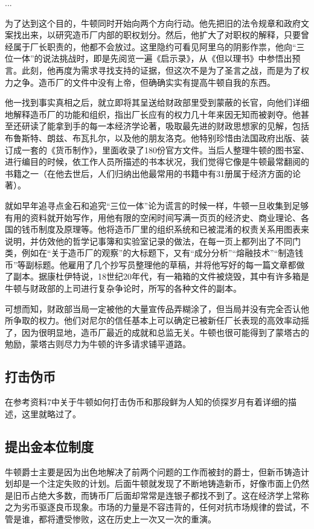 \documentclass[12pt,oneside]{book}
\begin{document}
\begin{mdframed}
...

为了达到这个目的，牛顿同时开始向两个方向行动。他先把旧的法令规章和政府文案找出来，以研究造币厂内部的职权划分。然后，他扩大了对职权的解释，只要曾经属于厂长职责的，他都不会放过。这里隐约可看见阿里乌的阴影作祟，他向“三位一体”的说法挑战时，即是先阅览一遍《启示录》，从《但以理书》中参悟出预言。此刻，他再度为需求寻找支持的证据，但这次不是为了圣言之战，而是为了权力之争。造币厂的文件中没有上帝，但确确实实有提高牛顿自我的东西。

他一找到事实真相之后，就立即将其呈送给财政部里受到蒙蔽的长官，向他们详细地解释造币厂的功能和组织，指出厂长应有的权力几十年来因无知而被剥夺。他甚至还研读了能拿到手的每一本经济学论著，吸取最先进的财政思想家的见解，包括布鲁斯特、朗兹、布瓦扎尔，以及他的朋友洛克。他特别珍惜由法国政府出版、装订成一套的《货币制作》，里面收录了180份官方文件。当后人整理牛顿的图书室、进行编目的时候，依工作人员所描述的书本状况，我们觉得它像是牛顿最常翻阅的书籍之一（在他去世后，人们归纳出他最常用的书籍中有31册属于经济方面的论著）。

就如早年追寻点金石和追究“三位一体”论为谎言的时候一样，牛顿一旦收集到足够有用的资料就开始写作，用他有限的空闲时间写满一页页的经济史、商业理论、各国的钱币制度及原理等。他将造币厂里的组织系统和已被混淆的权责关系用图表来说明，并仿效他的哲学记事簿和实验室记录的做法，在每一页上都列出了不同门类，例如在“关于造币厂的观察”的大标题下，又有“成分分析”“熔融技术”“制造钱币”等副标题。他雇用了几个抄写员整理他的草稿，并将他写好的每一篇文章都做了副本。据康杜伊特说，18世纪20年代，有一箱箱的文件被烧毁，其中有许多箱是牛顿与财政部的上司进行复杂争论时，所写的各种文件的副本。

可想而知，财政部当局一定被他的大量宣传品弄糊涂了，但当局并没有完全否认他所争取的权力。他们对尼尔的信任基本上可以确定已被新任厂长表现的高效率动摇了，因为很明显地，造币厂最近的成就和总监无关。牛顿也很可能得到了蒙塔古的勉励，蒙塔古则尽力为牛顿的许多请求铺平道路。

\end{mdframed}


\subsection{打击伪币}
在参考资料7中关于牛顿如何打击伪币和那段鲜为人知的侦探岁月有着详细的描述，这里就略过了。


\subsection{提出金本位制度}
牛顿爵士主要是因为出色地解决了前两个问题的工作而被封的爵士，但新币铸造计划却是一个注定失败的计划。后面牛顿就发现了不断地铸造新币，好像市面上仍然是旧币占绝大多数，而铸币厂后面却常常是连银子都找不到了。这在经济学上常称之为劣币驱逐良币现象。市场的力量是不容违背的，任何对抗市场规律的尝试，不管是谁，都将遭受惨败，这在历史上一次又一次的重演。
\end{document}
